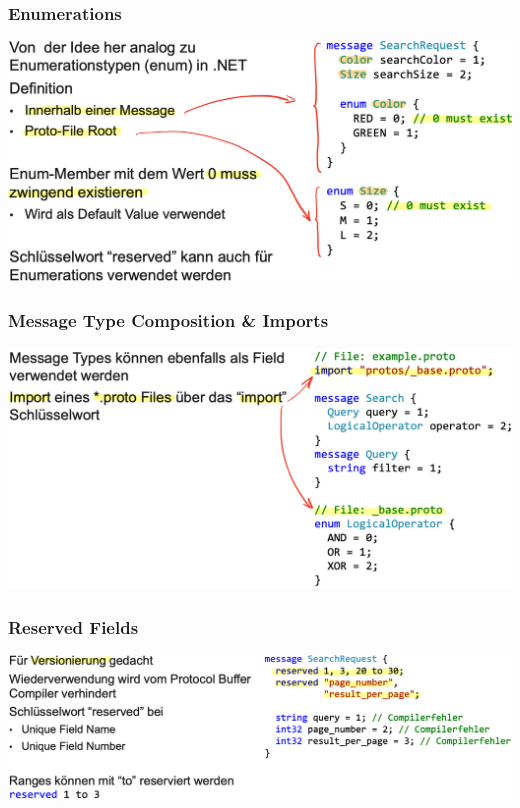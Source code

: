 \subsubsection{Enumerations}
\begin{center}
    \includegraphics[scale=.35]{graphic/gprc/Enumerations.png}
\end{center}
\vspace{-8pt}

\subsubsection{Message Type Composition \& Imports}
\begin{center}
    \includegraphics[scale=.35]{graphic/gprc/Message Type Composition Imports.png}
\end{center}
\vspace{-8pt}

\subsubsection{Reserved Fields}
\begin{center}
    \includegraphics[scale=.34]{graphic/gprc/reserved fields.png}
\end{center}
\vspace{-8pt}


